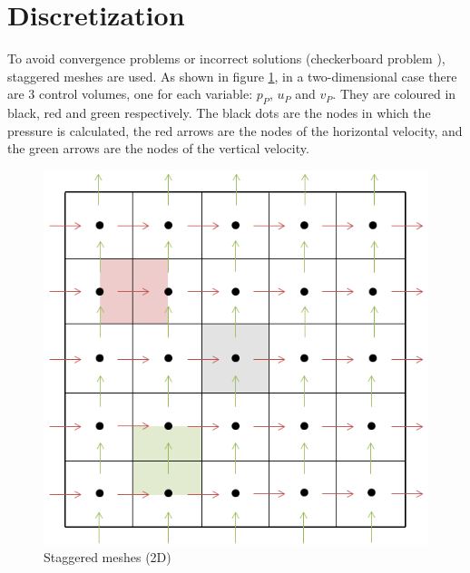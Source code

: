 \section{Discretization}
\label{FSMDiscretization}
To avoid convergence problems or incorrect solutions (checkerboard problem \cite{CTTCa}), staggered meshes are used. As shown in figure \ref{staggered}, in a two-dimensional case there are 3 control volumes, one for each variable: $p_{P}$, $u_{P}$ and $v_{P}$. They are coloured in black, red and green respectively. The black dots are the nodes in which the pressure is calculated, the red arrows are the nodes of the horizontal velocity, and the green arrows are the nodes of the vertical velocity.
\begin{figure}
	\centering
	\includegraphics[scale=0.65]{DrivenCavity/staggered}
	\caption{Staggered meshes (2D)}
	\label{staggered}
\end{figure}

